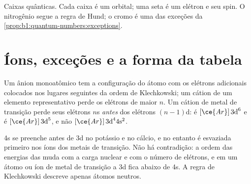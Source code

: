 \begin{omfigure}

{\small Caixas quânticas. Cada caixa é um orbital; uma seta é um elétron
e seu spin. O nitrogênio segue a regra de Hund; o cromo é uma das
exceções da \cref{prop:b1:quantum-numbers:exceptions}.}
\end{omfigure}

\section{Íons, exceções e a forma da tabela}

\begin{proposition}\label{prop:b1:quantum-numbers:ions}
Um ânion monoatômico tem a configuração do átomo com os elétrons
adicionais colocados nos lugares seguintes da ordem de Klechkowski; um
cátion de um elemento representativo perde os elétrons de maior $n$. Um
cátion de metal de transição perde seus elétrons $n$s \emph{antes} dos
elétrons $(n-1)$d:  é $[\ce{Ar}]\,3\text{d}^6$ e
 é $[\ce{Ar}]\,3\text{d}^5$, e não $[\ce{Ar}]\,3\text{d}^4
4\text{s}^2$.
\end{proposition}
\admitted

\begin{remark}\label{rem:b1:quantum-numbers:order}
4s se preenche antes de 3d no potássio e no cálcio, e no entanto é
esvaziada primeiro nos íons dos metais de transição. Não há contradição:
a ordem das energias das  muda com a carga nuclear e com o
número de elétrons, e em um átomo ou íon de metal de transição a
 3d fica abaixo de 4s. A regra de Klechkowski descreve apenas
átomos neutros.
\end{remark}

